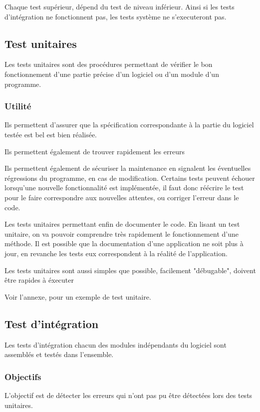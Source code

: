 Chaque test supérieur, dépend du test de niveau inférieur. 
Ainsi si les tests d'intégration ne fonctionnent pas, les tests système ne s'executeront pas. 


\subsection{Test unitaires}
Les tests unitaires sont des procédures permettant de vérifier le bon fonctionnement d'une partie précise d'un logiciel ou d'un module d'un programme. 

\subsubsection{Utilité}
Ils permettent d'assurer que la spécification correspondante à la partie du logiciel testée est bel est bien réalisée. 


\begin{description}
    \item Ils permettent également de trouver rapidement les erreurs 
    \item Ils permettent également de sécuriser la maintenance en signalent les éventuelles régressions du programme, en cas de modification. Certains tests peuvent échouer lorsqu'une nouvelle fonctionnalité est implémentée, il faut donc réécrire le test pour le faire correspondre aux nouvelles attentes, ou corriger l'erreur dans le code. 
    \item Les tests unitaires permettant enfin de documenter le code. En lisant un test unitaire, on va pouvoir comprendre très rapidement le fonctionnement d'une méthode. Il est possible que la documentation d'une application ne soit plus à jour, en revanche les tests eux correspondent à la réalité de l'application. 
\end{description}

Les tests unitaires sont aussi simples que possible, facilement "débugable", doivent être rapides à éxecuter

Voir l'annexe, pour un exemple de test unitaire. 


\subsection{Test d'intégration}
Les tests d'intégration chacun des modules indépendants du logiciel sont assemblés et testés dans l'ensemble. 

\subsubsection{Objectifs}
L'objectif est de détecter les erreurs qui n'ont pas pu être détectées lors des tests unitaires. 

